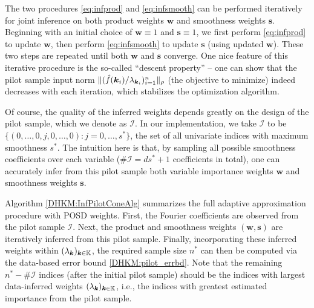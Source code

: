 \documentclass[USenglish]{article}
\theoremstyle{dgthm}
\theoremstyle{dgthm}
\theoremstyle{dgthm}
\theoremstyle{dgthm}
\theoremstyle{dgdef}
\theoremstyle{definition}
\begin{document}
The two procedures \eqref{eq:infprod} and \eqref{eq:infsmooth} can be performed iteratively for joint inference on both product weights $\mathbf{w}$ and smoothness weights $\mathbf{s}$. Beginning with an initial choice of $\mathbf{w} \equiv 1$ and $\mathbf{s} \equiv 1$, we first perform \eqref{eq:infprod} to update $\mathbf{w}$, then perform \eqref{eq:infsmooth} to update $\mathbf{s}$ (using updated $\mathbf{w}$). These two steps are repeated until both $\mathbf{w}$ and $\mathbf{s}$ converge. One nice feature of this iterative procedure is the so-called ``descent property'' -- one can show that the pilot sample input norm $\|(\hat{f}({\boldsymbol{k}}_i)/\lambda_{{\boldsymbol{k}}_i})_{i=1}^n\|_{\rho}$ (the objective to minimize) indeed decreases with each iteration, which stabilizes the optimization algorithm.

Of course, the quality of the inferred weights depends greatly on the design of the pilot sample, which we denote as $\mathcal{I}$. In our implementation, we take $\mathcal{I}$ to be $\{ (0, \ldots, 0, j, 0, \ldots, 0): j = 0, \ldots, s^*\}$, the set of all univariate indices with maximum smoothness $s^*$. The intuition here is that, by sampling all possible smoothness coefficients over each variable ($\# \mathcal{I} = d s^* + 1$ coefficients in total), one can accurately infer from this pilot sample both variable importance weights $\mathbf{w}$ and smoothness weights $\mathbf{s}$.

Algorithm \ref{DHKM:InfPilotConeAlg} summarizes the full adaptive approximation procedure with POSD weights. First, the Fourier coefficients are observed from the pilot sample $\mathcal{I}$. Next, the product and smoothness weights $(\mathbf{w},\mathbf{s})$ are iteratively inferred from this pilot sample. Finally, incorporating these inferred weights within $(\lambda_{{\boldsymbol{k}}})_{{\boldsymbol{k}} \in \mathbb{K}}$, the required sample size $n^*$ can then be computed via the data-based error bound \eqref{DHKM:pilot_errbd}. Note that the remaining $n^* - \# \mathcal{I}$ indices (after the initial pilot sample) should be the indices with largest data-inferred weights $(\lambda_{{\boldsymbol{k}}})_{{\boldsymbol{k}} \in \mathbb{K}}$, i.e., the indices with greatest estimated importance from the pilot sample.
\end{document}
